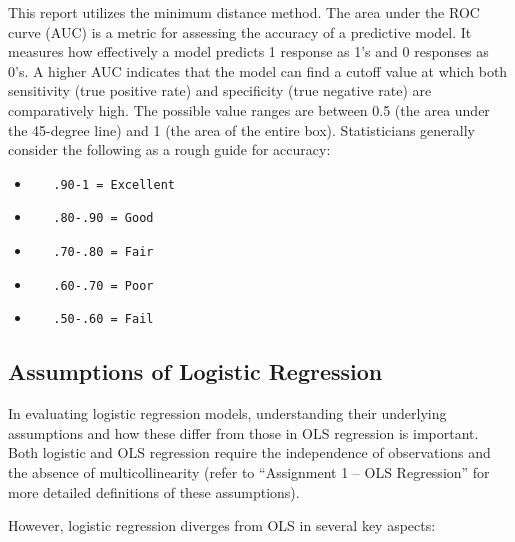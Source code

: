 \documentclass[
]{article}
\begin{document}
This report utilizes the minimum distance method. The area under the ROC
curve (AUC) is a metric for assessing the accuracy of a predictive
model. It measures how effectively a model predicts 1 response as 1's
and 0 responses as 0's. A higher AUC indicates that the model can find a
cutoff value at which both sensitivity (true positive rate) and
specificity (true negative rate) are comparatively high. The possible
value ranges are between 0.5 (the area under the 45-degree line) and 1
(the area of the entire box). Statisticians generally consider the
following as a rough guide for accuracy:

\begin{itemize}
\item
\begin{verbatim}
   .90-1 = Excellent
\end{verbatim}
\item
\begin{verbatim}
   .80-.90 = Good
\end{verbatim}
\item
\begin{verbatim}
   .70-.80 = Fair
\end{verbatim}
\item
\begin{verbatim}
   .60-.70 = Poor
\end{verbatim}
\item
\begin{verbatim}
   .50-.60 = Fail
\end{verbatim}
\end{itemize}

\hypertarget{assumptions-of-logistic-regression}{%
\subsection{Assumptions of Logistic
Regression}\label{assumptions-of-logistic-regression}}

In evaluating logistic regression models, understanding their underlying
assumptions and how these differ from those in OLS regression is
important. Both logistic and OLS regression require the independence of
observations and the absence of multicollinearity (refer to ``Assignment
1 -- OLS Regression'' for more detailed definitions of these
assumptions).

However, logistic regression diverges from OLS in several key aspects:
\end{document}
